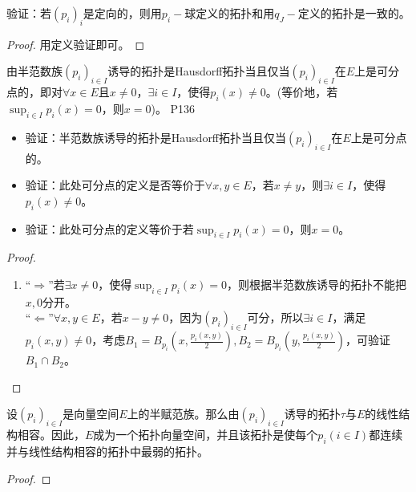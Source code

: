 \begin{proposition}
		验证：$若(p_{i})_{i}$是定向的，则用$p_{i}- $球定义的拓扑和用$q_{J}- $定义的拓扑是一致的。 
\end{proposition}

\begin{proof}
	用定义验证即可。
\end{proof}

\original
{
	由半范数族$(p_{i})_{i\in I} $诱导的拓扑是Hausdorff拓扑当且仅当$(p_{i})_{i\in I} $在$E $上是可分点的，即对$\forall x\in E $且$x\neq 0 $，$\exists i \in I $，使得$p_{i}(x)\neq 0 $。(等价地，若$\sup_{i\in I} p_{i}(x)=0$，则$x=0$)。
}
{P136}
\begin{proposition}
	\begin{itemize}
		\item 验证：半范数族诱导的拓扑是Hausdorff拓扑当且仅当$(p_{i})_{i\in I} $在$E$上是可分点的。
		\item 验证：此处可分点的定义是否等价于$\forall x,y\in E$，若$x\neq y $，则$\exists i\in I $，使得$p_{i}(x)\neq 0 $。
		\item 验证：此处可分点的定义等价于若$\sup_{i \in I} p_{i}(x) =0 $，则$x=0 $。
	\end{itemize}
\end{proposition}

\begin{proof}
	\begin{enumerate}
		\item “$\Rightarrow$”若$\exists x\neq  0$，使得$\sup_{i \in I}p_{i}(x)=0 $，则根据半范数族诱导的拓扑不能把$x,0$分开。\\
		“$\Leftarrow $”$\forall x,y\in E $，若$ x-y \neq 0$，因为$(p_{i})_{i\in I} $可分，所以$\exists i\in I $，满足$p_{i}(x,y)\neq 0 $，考虑$B_{1}=B_{p_{i}}(x,\frac{p_{i}(x,y)}{2}) ,B_{2}=B_{p_{i}}(y,\frac{p_{i}(x,y)}{2})$，可验证$B_{1}\cap B_{2} $。
	\end{enumerate}
\end{proof}

\begin{theorem}\label{XQHthe070201}
	设$(p_{i})_{i\in I} $是向量空间$E$上的半赋范族。那么由$(p_{i})_{i\in I} $诱导的拓扑$\tau $与$E$的线性结构相容。因此，$E$成为一个拓扑向量空间，并且该拓扑是使每个$p_{i}(i\in I)$都连续并与线性结构相容的拓扑中最弱的拓扑。
\end{theorem}
\begin{proof}
	
\end{proof}

